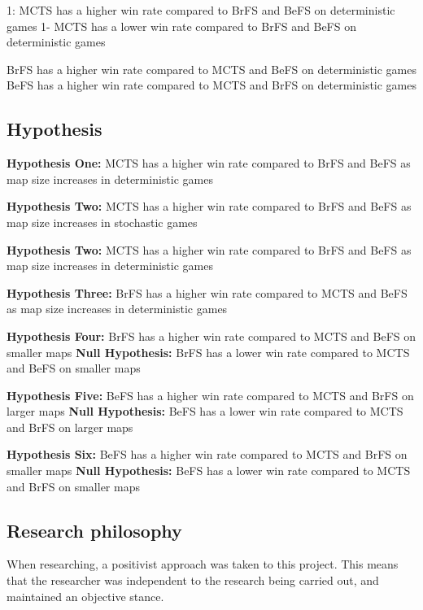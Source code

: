 \documentclass[journal]{IEEEtran}
\begin{document}


1: MCTS has a higher win rate compared to BrFS and BeFS on deterministic games
1- MCTS has a lower win rate compared to BrFS and BeFS on deterministic games

BrFS has a higher win rate compared to MCTS and BeFS on deterministic games
BeFS has a higher win rate compared to MCTS and BrFS on deterministic games

\subsection{Hypothesis}

	\textbf{Hypothesis One:}
		MCTS has a higher win rate compared to BrFS and BeFS as map size increases in deterministic games

	\textbf{Hypothesis Two:}
		MCTS has a higher win rate compared to BrFS and BeFS as map size increases in stochastic games

	\textbf{Hypothesis Two:}
		MCTS has a higher win rate compared to BrFS and BeFS as map size increases in deterministic games	

	\textbf{Hypothesis Three:}
		BrFS has a higher win rate compared to MCTS and BeFS as map size increases in deterministic games

	\textbf{Hypothesis Four:}
		BrFS has a higher win rate compared to MCTS and BeFS on smaller maps
	\textbf{Null Hypothesis:}
		BrFS has a lower win rate compared to MCTS and BeFS on smaller maps

	\textbf{Hypothesis Five:}
		BeFS has a higher win rate compared to MCTS and BrFS on larger maps
	\textbf{Null Hypothesis:}
		BeFS has a lower win rate compared to MCTS and BrFS on larger maps
		
	\textbf{Hypothesis Six:}
		BeFS has a higher win rate compared to  MCTS and BrFS on smaller maps
	\textbf{Null Hypothesis:}
		BeFS has a lower win rate compared to  MCTS and BrFS on smaller maps


\subsection{Research philosophy}
	When researching, a positivist approach \cite{scientific-method, crossan2003research} was taken to this project. 
	This means that the researcher was independent to the research being carried out, and maintained an objective stance.
	
\end{document}
